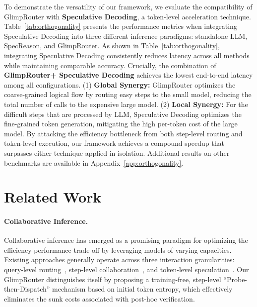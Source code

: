 \documentclass[11pt]{article}
\newcommand{\approach}{{GlimpRouter}\xspace}
\begin{document}
To demonstrate the versatility of our framework, we evaluate the compatibility of \approach with \textbf{Speculative Decoding}, a token-level acceleration technique. Table~\ref{tab:orthogonality} presents the performance metrics when integrating Speculative Decoding into three different inference paradigms: standalone LLM, SpecReason, and \approach.
As shown in Table~\ref{tab:orthogonality}, integrating Speculative Decoding consistently reduces latency across all methods while maintaining comparable accuracy.
Crucially, the combination of \textbf{\approach + Speculative Decoding} achieves the lowest end-to-end latency among all configurations. 
(1) \textbf{Global Synergy:} \approach optimizes the coarse-grained logical flow by routing easy steps to the small model, reducing the total number of calls to the expensive large model.
(2) \textbf{Local Synergy:} For the difficult steps that are processed by LLM, Speculative Decoding optimizes the fine-grained token generation, mitigating the high per-token cost of the large model.
By attacking the efficiency bottleneck from both step-level routing and token-level execution, our framework achieves a compound speedup that surpasses either technique applied in isolation.
Additional results on other benchmarks are available in Appendix~\ref{app:orthogonality}.








\section{Related Work}
\label{sec:related_work}

\paragraph{Collaborative Inference.}
Collaborative inference has emerged as a promising paradigm for optimizing the efficiency-performance trade-off by leveraging models of varying capacities. Existing approaches generally operate across three interaction granularities: query-level routing~\cite{chen2023frugalgpt, ding2024hybrid, ong2024routellm}, step-level collaboration~\cite{shi2025speccot, pan2025specreason, liaoreward}, and token-level speculation~\cite{leviathan2023fast, chen2023accelerating, cai2024medusa, li2024eagle}.
Our \approach distinguishes itself by proposing a training-free, step-level ``Probe-then-Dispatch'' mechanism based on initial token entropy, which effectively eliminates the sunk costs associated with post-hoc verification.
\end{document}
